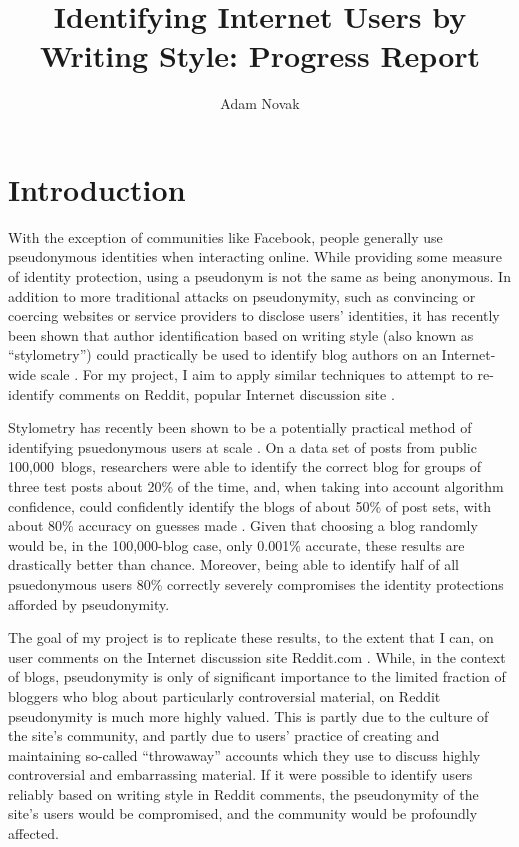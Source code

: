 \documentclass{article}
\author{Adam Novak}
\title{Identifying Internet Users by Writing Style: Progress Report}
\begin{document}
\maketitle

\section{Introduction}
With the exception of communities like Facebook, people generally use pseudonymous identities when interacting online. While providing some measure of identity protection, using a pseudonym is not the same as being anonymous. In addition to more traditional attacks on pseudonymity, such as convincing or coercing websites or service providers to disclose users' identities, it has recently been shown that author identification based on writing style (also known as ``stylometry'') could practically be used to identify blog authors on an Internet-wide scale \cite{narayanan2012feasibility}. For my project, I aim to apply similar techniques to attempt to re-identify comments on Reddit, popular Internet discussion site \cite{reddit2012reddit}.

Stylometry has recently been shown to be a potentially practical method of identifying psuedonymous users at scale \cite{narayanan2012feasibility}. On a data set of posts from public 100,000~blogs, researchers were able to identify the correct blog for groups of three test posts about 20\% of the time, and, when taking into account algorithm confidence, could confidently identify the blogs of about 50\% of post sets, with about 80\% accuracy on guesses made \cite{narayanan2012feasibility}. Given that choosing a blog randomly would be, in the 100,000-blog case, only 0.001\% accurate, these results are drastically better than chance. Moreover, being able to identify half of all psuedonymous users 80\% correctly severely compromises the identity protections afforded by pseudonymity.

The goal of my project is to replicate these results, to the extent that I can, on user comments on the Internet discussion site Reddit.com \cite{reddit2012reddit}. While, in the context of blogs, pseudonymity is only of significant importance to the limited fraction of bloggers who blog about particularly controversial material, on Reddit pseudonymity is much more highly valued. This is partly due to the culture of the site's community, and partly due to users' practice of creating and maintaining so-called ``throwaway'' accounts which they use to discuss highly controversial and embarrassing material. If it were possible to identify users reliably based on writing style in Reddit comments, the pseudonymity of the site's users would be compromised, and the community would be profoundly affected.
\end{document}

